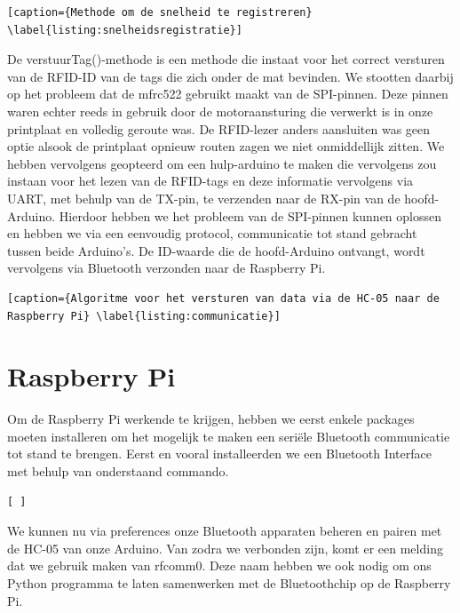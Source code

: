 
\begin{lstlisting}[caption={Methode om de snelheid te registreren} \label{listing:snelheidsregistratie}]
\end{lstlisting}

De verstuurTag()-methode is een methode die instaat voor het correct versturen van de RFID-ID van de tags die zich onder de mat bevinden. We stootten daarbij op het probleem dat de mfrc522 gebruikt maakt van de SPI-pinnen. Deze pinnen waren echter reeds in gebruik door de motoraansturing die verwerkt is in onze printplaat en volledig geroute was. De RFID-lezer anders aansluiten was geen optie alsook de printplaat opnieuw routen zagen we niet onmiddellijk zitten. We hebben vervolgens geopteerd om een hulp-arduino te maken die vervolgens zou instaan voor het lezen van de RFID-tags en deze informatie vervolgens via UART, met behulp van de TX-pin, te verzenden naar de RX-pin van de hoofd-Arduino. Hierdoor hebben we het probleem van de SPI-pinnen kunnen oplossen en hebben we via een eenvoudig protocol, communicatie tot stand gebracht tussen beide Arduino's. De ID-waarde die de hoofd-Arduino ontvangt, wordt vervolgens via Bluetooth verzonden naar de Raspberry Pi.


\begin{lstlisting}[caption={Algoritme voor het versturen van data via de HC-05 naar de Raspberry Pi} \label{listing:communicatie}]
\end{lstlisting}

\section{Raspberry Pi}


Om de Raspberry Pi werkende te krijgen, hebben we eerst enkele packages moeten installeren om het mogelijk te maken een seri\"ele Bluetooth communicatie tot stand te brengen. Eerst en vooral installeerden we een Bluetooth Interface met behulp van onderstaand commando.


\begin{lstlisting}[ ]
\end{lstlisting}

We kunnen nu via preferences onze Bluetooth apparaten beheren en pairen met de HC-05 van onze Arduino. Van zodra we verbonden zijn, komt er een melding dat we gebruik maken van rfcomm0. Deze naam hebben we ook nodig om ons Python programma te laten samenwerken met de Bluetoothchip op de Raspberry Pi. 

